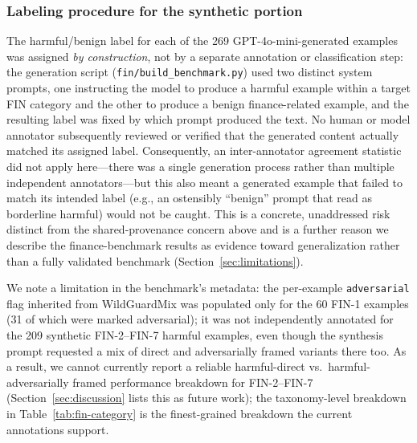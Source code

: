 \documentclass[superintelligence,article,accept,moreauthors]{Definitions/mdpi}
\begin{document}
\subsubsection{Labeling procedure for the synthetic portion
} The harmful/benign label for each of the 269 GPT-4o-mini-generated examples was assigned \emph{by construction}, not by a separate annotation or classification step: the generation script (\texttt{fin/build\_benchmark.py}) used two distinct system prompts, one instructing the model to produce a harmful example within a target FIN category and the other to produce a benign finance-related example, and the resulting label was fixed by which prompt produced the text. No human or model annotator subsequently reviewed or verified that the generated content actually matched its assigned label. Consequently, an inter-annotator agreement statistic did not apply here---there was a single generation process rather than multiple independent annotators---but this also meant a generated example that failed to match its intended label (e.g., an ostensibly ``benign'' prompt that read as borderline harmful) would not be caught. This is a concrete, unaddressed risk distinct from the shared-provenance concern above and is a further reason we describe the finance-benchmark results as evidence toward generalization rather than a fully validated benchmark (Section~\ref{sec:limitations}).

We note a limitation in the benchmark's metadata: the per-example \texttt{adversarial} flag inherited from WildGuardMix was populated only for the 60 FIN-1 examples (31 of which were marked adversarial); it was not independently annotated for the 209 synthetic FIN-2--FIN-7 harmful examples, even though the synthesis prompt requested a mix of direct and adversarially framed variants there too. As a result, we cannot currently report a reliable harmful-direct vs.\ harmful-adversarially framed performance breakdown for FIN-2--FIN-7 (Section~\ref{sec:discussion} lists this as future work); the taxonomy-level breakdown in Table~\ref{tab:fin-category} is the finest-grained breakdown the current annotations support.
\end{document}
